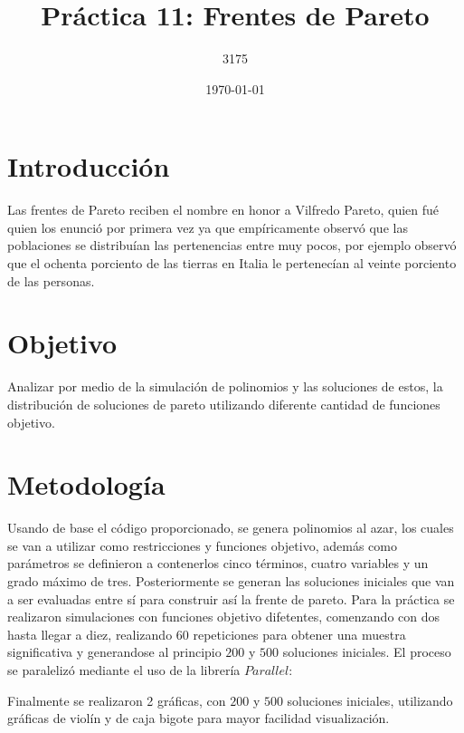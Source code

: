 \documentclass{article}
\author{3175}
\title{Práctica 11: Frentes de Pareto}
\date{\today}
\begin{document}
\maketitle


\section{Introducción}

Las frentes de Pareto reciben el nombre en honor a Vilfredo Pareto, quien fué quien los enunció por primera vez ya que empíricamente observó que las poblaciones se distribuían las pertenencias entre muy pocos, por ejemplo observó que el ochenta porciento de las tierras en Italia le pertenecían al veinte porciento de las personas\citep{web1}.
 
\section{Objetivo}
Analizar por medio de la simulación de polinomios y las soluciones de estos, la distribución de soluciones de pareto utilizando diferente cantidad de funciones objetivo.

\section{Metodología}

Usando de base el código proporcionado\citep{webelisa}, se genera polinomios al azar, los cuales se van a utilizar como restricciones y funciones objetivo, además como parámetros se definieron a contenerlos cinco términos, cuatro variables y un grado máximo de tres. Posteriormente se generan las soluciones iniciales que van a ser evaluadas entre sí para construir así la frente de pareto. Para la práctica se realizaron simulaciones con funciones objetivo difetentes, comenzando con dos hasta llegar a diez, realizando $60$ repeticiones para obtener una muestra significativa y generandose al principio $200$ y $500$ soluciones iniciales.
El proceso se paralelizó mediante el uso de la librería $Parallel$:



Finalmente se realizaron 2 gráficas, con $200$ y $500$ soluciones iniciales, utilizando gráficas de violín y de caja bigote para mayor facilidad visualización\citep{web2}.
\end{document}
